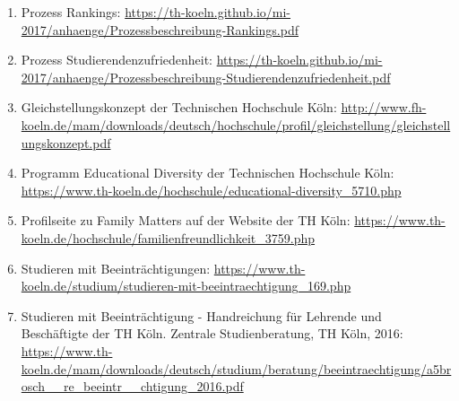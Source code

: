\documentclass[BCOR12mm,DIV11,titlepage,a4paper,oneside,10pt]{scrbook}
\begin{document}
\begin{sloppypar}
\begin{flushleft}
\begin{enumerate}
\item{Prozess Rankings: \url{https://th-koeln.github.io/mi-2017/anhaenge/Prozessbeschreibung-Rankings.pdf} } 
\item{Prozess Studierendenzufriedenheit: \url{https://th-koeln.github.io/mi-2017/anhaenge/Prozessbeschreibung-Studierendenzufriedenheit.pdf} } 
\item{Gleichstellungskonzept der Technischen Hochschule Köln: \url{http://www.fh-koeln.de/mam/downloads/deutsch/hochschule/profil/gleichstellung/gleichstellungskonzept.pdf} } 
\item{Programm Educational Diversity der Technischen Hochschule Köln: \url{https://www.th-koeln.de/hochschule/educational-diversity\_5710.php} } 
\item{Profilseite zu Family Matters auf der Website der TH Köln: \url{https://www.th-koeln.de/hochschule/familienfreundlichkeit\_3759.php} } 
\item{Studieren mit Beeinträchtigungen: \url{https://www.th-koeln.de/studium/studieren-mit-beeintraechtigung\_169.php} } 
\item{Studieren mit Beeinträchtigung - Handreichung für Lehrende und Beschäftigte der TH Köln. Zentrale Studienberatung, TH Köln, 2016: \url{https://www.th-koeln.de/mam/downloads/deutsch/studium/beratung/beeintraechtigung/a5brosch\_\_re\_beeintr\_\_chtigung\_2016.pdf} } 

\end{enumerate}

\end{flushleft}
\end{sloppypar}

\backmatter
\end{document}

